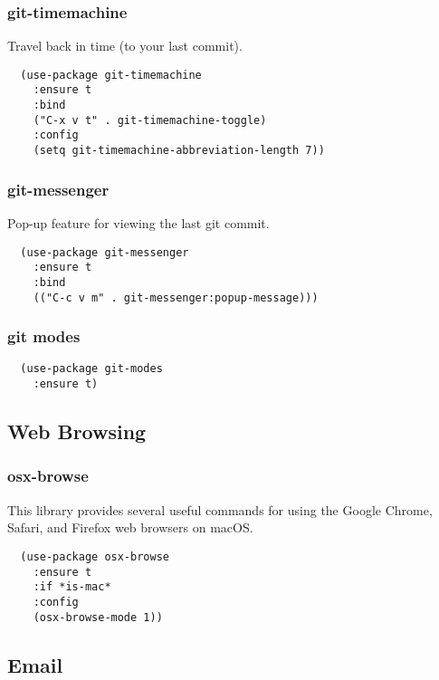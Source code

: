 \documentclass[11pt]{article}
\begin{document}
\subsubsection*{git-timemachine}
\label{sec:org35e2850}

Travel back in time (to your last commit).

\begin{verbatim}
  (use-package git-timemachine
    :ensure t
    :bind
    ("C-x v t" . git-timemachine-toggle)
    :config
    (setq git-timemachine-abbreviation-length 7))
\end{verbatim}

\subsubsection*{git-messenger}
\label{sec:org3aa3257}

Pop-up feature for viewing the last git commit.

\begin{verbatim}
  (use-package git-messenger
    :ensure t
    :bind
    (("C-c v m" . git-messenger:popup-message)))
\end{verbatim}

\subsubsection*{git modes}
\label{sec:orga4290ca}

\begin{verbatim}
  (use-package git-modes
    :ensure t)
\end{verbatim}
\subsection*{Web Browsing}
\label{sec:org8ac190d}
\subsubsection*{osx-browse}
\label{sec:org511524a}

This library provides several useful commands for using the
Google Chrome, Safari, and Firefox web browsers on macOS.

\begin{verbatim}
  (use-package osx-browse
    :ensure t
    :if *is-mac*
    :config
    (osx-browse-mode 1))
\end{verbatim}

\subsection*{Email}
\label{sec:orgeb3abb8}
\end{document}
